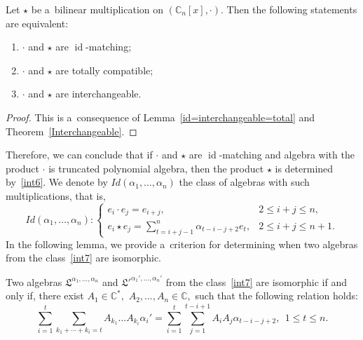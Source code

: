 \documentclass{jonasart}
\DeclareMathOperator{\id}{id}
\begin{document}
	\begin{corollary}
		Let $\star$ be a~bilinear multiplication on $(\mathbb{C}_n [x],\cdot)$. Then the following statements are equivalent:
		\begin{enumerate}
			\item $\cdot$ and $\star$ are $\id$-matching;
			\item $\cdot$ and $\star$ are totally compatible;
			\item $\cdot$ and $\star$ are interchangeable.
		\end{enumerate}
	\end{corollary}

	\begin{proof}
		This is a~consequence of Lemma~\ref{id=interchangeable=total} and Theorem~\ref{Interchangeable}.
	\end{proof}

	Therefore, we can conclude that if $\cdot$ and $\star$ are $\id$-matching and algebra with the product $\cdot$ is truncated polynomial algebra, then the product $\star$ is determined by~\eqref{int6}. We denote by $Id(\alpha_1,\dots,\alpha_n )$ the class of algebras with such multiplications, that is,
	\begin{equation}\label{int7}
		Id(\alpha_1,\dots,\alpha_n ):
		\left\{
		\begin{array}{ll}
			e_i \cdot e_j =e_{i+j}, & 2\leq i+j \leq n, \\[1mm]
			e_i \star e_j =\sum_{t=i+j-1}^{n}\alpha_{t-i-j+2}e_t, & 2\leq i+j \leq n+1.
		\end{array}
		\right.
	\end{equation}
	In the following lemma, we provide a~criterion for determining when two algebras from the class~\eqref{int7} are isomorphic.

	\begin{lemma}\label{Lemma10}
		Two algebras $\mathfrak{L}^{\alpha_1,\dots,\alpha_n}$ and $\mathfrak{L}'^{\alpha_1 ',\dots,\alpha_n '}$ from the class~\eqref{int7} are isomorphic if and only if, there exist $A_1 \in \mathbb{C}^*,$ $A_2, \dots, A_n \in \mathbb{C},$ such that the following relation holds:
		\begin{equation}\label{inteq1}
			\sum_{i=1}^t\sum_{k_1 +\cdots+k_i =t} A_{k_1} \dots A_{k_i}\alpha_i ' = \sum_{i=1}^{t} \sum_{j=1}^{t-i+1} A_i A_j \alpha_{t-i-j+2}, \ \ 1\leq t\leq n.
		\end{equation}
	\end{lemma}
\end{document}
